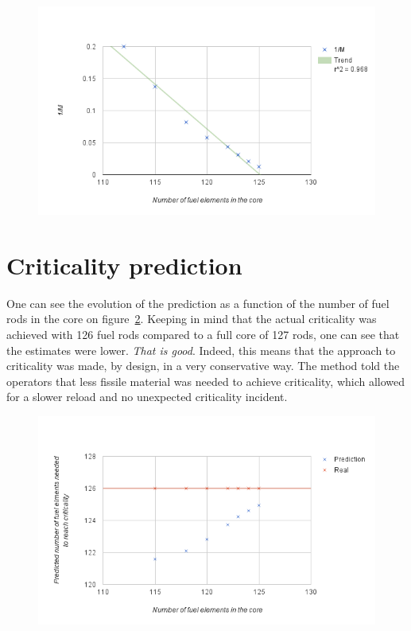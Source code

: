 \begin{figure}[t!]
	\centering
	\includegraphics[height=0.4\textheight]{fig02/1overM.png}
	\label{fig:1overM}
\end{figure}

\section{Criticality prediction}

One can see the evolution of the prediction as a function of the number of fuel rods in the core on figure~\ref{fig:prediction}. Keeping in mind that the actual criticality was achieved with 126 fuel rods compared to a full core of 127 rods, one can see that the estimates were lower. \emph{That is good}. Indeed, this means that the approach to criticality was made, by design, in a very conservative way. The method told the operators that less fissile material was needed to achieve criticality, which allowed for a slower reload and no unexpected criticality incident.


\begin{figure}[t!]
	\centering
	\includegraphics[height=0.4\textheight]{fig02/prediction.png}
	\label{fig:prediction}
\end{figure}

